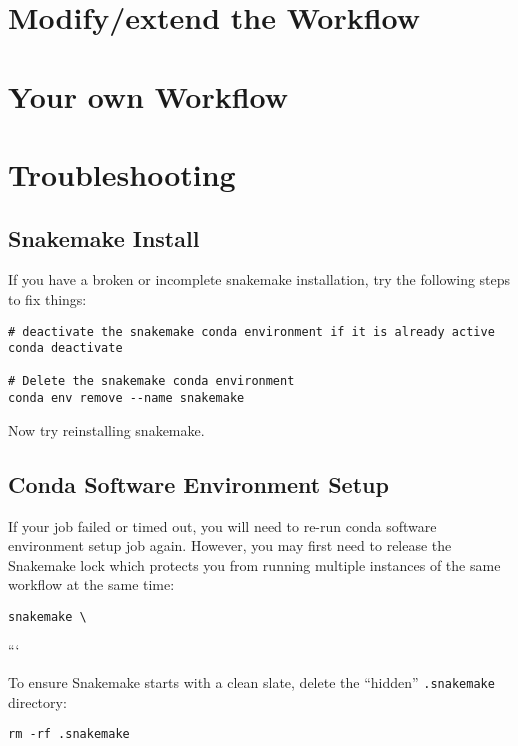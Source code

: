 \section{Modify/extend the Workflow}

\section{Your own Workflow}

\section{Troubleshooting}

\subsection{Snakemake Install}

If you have a broken or incomplete snakemake installation, try the following steps to fix things:

\begin{lstlisting}
# deactivate the snakemake conda environment if it is already active
conda deactivate

# Delete the snakemake conda environment
conda env remove --name snakemake
\end{lstlisting}

Now try reinstalling snakemake.

\subsection{Conda Software Environment Setup}

If your job failed or timed out, you will need to re-run conda software environment setup job again. However, you may first need to release the
Snakemake lock which protects you from running multiple instances of the same workflow at the same time:

\begin{lstlisting}
snakemake \
\end{lstlisting}
```

To ensure Snakemake starts with a clean slate, delete the ``hidden'' \texttt{.snakemake} directory:

\begin{lstlisting}
rm -rf .snakemake
\end{lstlisting}
